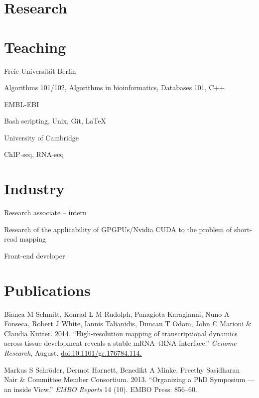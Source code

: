 \documentclass{klmr-cv}
\newcommand*\cpp{C++}
\begin{document}
\section{Research}

\section{Teaching}

\date{2008--2011}
\item{}
\item{Freie Universität Berlin}
\item{Algorithms 101/102, Algorithms in bioinformatics, Databases 101, \cpp}

\date{2011--2014}
\item{}
\item{EMBL-EBI}
\item{Bash scripting, Unix, Git, \LaTeX}

\date{2013--2015}
\item{}
\item{University of Cambridge}
\item{ChIP-seq, RNA-seq}

\section{Industry}

\date{Oct 2008--Feb 2009}
\item{}
\item{Research associate -- intern}
\item{Research of the applicability of GPGPUs/Nvidia CUDA to the problem of
        short-read mapping}

\date{Jan 2007--Jan 2008}
\item{}
\item{Front-end developer}

\section{Publications}

\item{Bianca M Schmitt, Konrad L M Rudolph, Panagiota Karagianni, Nuno A
    Fonseca, Robert J White, Iannis Talianidis, Duncan T Odom, John C Marioni
    \& Claudia Kutter. 2014. “High-resolution mapping of transcriptional
    dynamics across tissue development reveals a stable mRNA–tRNA interface.”
    \textit{Genome Research}, August.
    \href{http://dx.doi.org/10.1101/gr.176784.114.}{doi:10.1101/gr.176784.114.}}
\item{Markus S Schröder, Dermot Harnett, Benedikt A Minke, Preethy Sasidharan
    Nair \& Committee Member Consortium. 2013. “Organizing a PhD Symposium ---
    an inside View.” \textit{EMBO Reports} 14 (10). EMBO Press: 856–60.}
\end{document}
